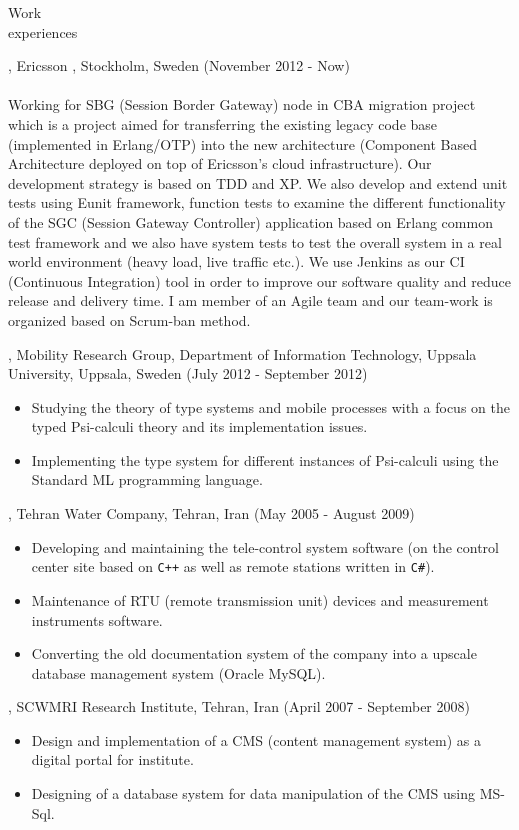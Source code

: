 \documentclass{resume}
\begin{document}
\begin{category}{Work \\experiences}

, Ericsson , Stockholm, Sweden (November 2012 - Now)\\ \\
Working for SBG (Session Border Gateway) node in CBA migration project which is a project 
aimed for transferring the existing legacy code base (implemented in Erlang/OTP) into the 
new architecture (Component Based Architecture deployed on top of Ericsson's cloud infrastructure). 
Our development strategy is based on TDD and XP. We also develop and extend unit tests using Eunit framework, 
function tests to examine the different functionality of the SGC (Session Gateway Controller) application 
based on Erlang common test framework and we also have system tests to test the overall system in a real 
world environment (heavy load, live traffic etc.). 
We use Jenkins as our CI (Continuous Integration) tool in order to improve our software 
quality and reduce release and delivery time. I am member of an Agile team and our team-work is 
organized based on Scrum-ban method.

, Mobility Research Group, Department of Information Technology, Uppsala University, Uppsala, Sweden (July 2012 - September 2012)\\ 
\begin{itemize}
 \item Studying the theory of type systems and mobile processes with a focus on the typed Psi-calculi theory
  and its implementation issues.
 \item Implementing the type system for different instances of Psi-calculi using the Standard ML programming language.
\end{itemize}

, Tehran Water Company, Tehran, Iran (May 2005 - August 2009)\\ 
\begin{itemize}
 \item Developing and maintaining the tele-control system software (on the control center site based on \texttt{C++} as well as remote stations written in \texttt{C\#}).
 \item Maintenance of RTU (remote transmission unit) devices and measurement instruments software.
 \item Converting the old documentation system of the company into a upscale database management system (Oracle MySQL).
\end{itemize}

, SCWMRI Research Institute, 
Tehran, Iran (April 2007 - September 2008)
\begin{itemize} 
\item Design and implementation of a CMS (content management system) as a digital portal for institute.
\item Designing of a database system for data manipulation of the CMS using MS-Sql.
\end{itemize}

\end{category}
\end{document}
